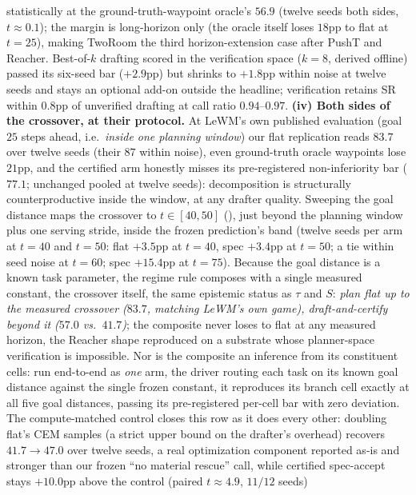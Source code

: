 \documentclass{article}
\begin{document}
statistically at the ground-truth-waypoint oracle's $56.9$ (twelve seeds both
sides, $t{\approx}0.1$); the margin is
long-horizon only (the oracle itself loses $18$pp to flat at $t{=}25$), making
TwoRoom the third horizon-extension case after PushT and Reacher. Best-of-$k$
drafting scored in the verification space ($k{=}8$, derived offline) passed its
six-seed bar ($+2.9$pp) but shrinks to $+1.8$pp within noise at twelve seeds and
stays an optional add-on outside the headline; verification retains SR within
$0.8$pp of unverified drafting at call ratio $0.94$--$0.97$.
\textbf{(iv) Both sides of the crossover, at their protocol.} At LeWM's own
published evaluation (goal $25$ steps ahead, i.e.\ \emph{inside one planning
window}) our flat replication reads $83.7$ over twelve seeds (their $87$ within
noise), even ground-truth oracle waypoints lose $21$pp, and the certified arm
honestly misses its pre-registered non-inferiority bar ($77.1$; unchanged
pooled at twelve seeds): decomposition
is structurally counterproductive inside the window, at any drafter quality.
Sweeping the goal distance maps the crossover to $t \in [40, 50]$
(), just beyond the planning window plus one serving
stride, inside the frozen prediction's band (twelve seeds per arm at $t{=}40$
and $t{=}50$: flat $+3.5$pp at $t{=}40$, spec $+3.4$pp at $t{=}50$; a tie
within seed noise at $t{=}60$; spec $+15.4$pp at
$t{=}75$). Because the goal distance is a known task parameter, the regime rule
composes with a single measured constant, the crossover itself, the same
epistemic status as $\tau$ and $S$: \emph{plan flat up to the measured
crossover ($83.7$, matching LeWM's own game), draft-and-certify beyond it
($57.0$ vs.\ $41.7$)}; the composite never loses to flat at any measured
horizon, the Reacher shape reproduced on a substrate whose planner-space
verification is impossible. Nor is the composite an inference from its
constituent cells: run end-to-end as \emph{one} arm, the driver routing each
task on its known goal distance against the single frozen constant, it
reproduces its branch cell exactly at all five goal distances, passing its
pre-registered per-cell bar with zero deviation. The compute-matched control closes this row as it
does every other: doubling flat's CEM samples (a strict upper bound on the
drafter's overhead) recovers $41.7 \to 47.0$ over twelve seeds, a real
optimization component
reported as-is and stronger than our frozen ``no material rescue'' call, while
certified spec-accept stays $+10.0$pp above the control (paired
$t{\approx}4.9$, $11/12$ seeds)
\end{document}
